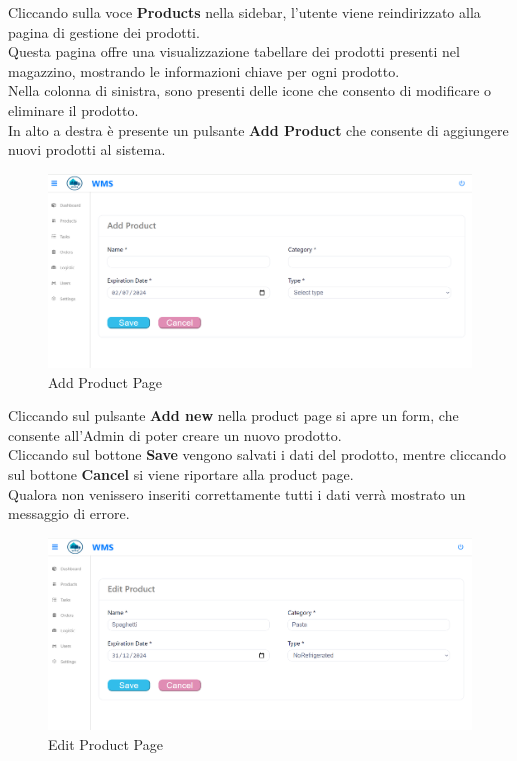 Cliccando sulla voce \textbf{Products} nella sidebar, l'utente viene reindirizzato alla pagina di gestione dei prodotti.\\
Questa pagina offre una visualizzazione tabellare dei prodotti presenti nel magazzino,
mostrando le informazioni chiave per ogni prodotto.\\
Nella colonna di sinistra, sono presenti delle icone che consento di modificare o eliminare il prodotto.\\
In alto a destra è presente un pulsante \textbf{Add Product} che consente di aggiungere nuovi prodotti al sistema.

\begin{figure}[H]
    \centering
    \includegraphics[width=\textwidth]{document/sections/img/Storyboard/addProductPage.png}
    \caption{Add Product Page}
    \label{fig:addProductPages}
\end{figure}

Cliccando sul pulsante \textbf{Add new} nella product page si apre un form, che consente
all'Admin di poter creare un nuovo prodotto.\\
Cliccando sul bottone \textbf{Save} vengono salvati i dati del prodotto, mentre cliccando sul bottone \textbf{Cancel} si viene
riportare alla product page.\\
Qualora non venissero inseriti correttamente tutti i dati verrà mostrato un messaggio di errore.

\begin{figure}[H]
    \centering
    \includegraphics[width=\textwidth]{document/sections/img/Storyboard/editProductPage.png}
    \caption{Edit Product Page}
    \label{fig:editProductPage}
\end{figure}

